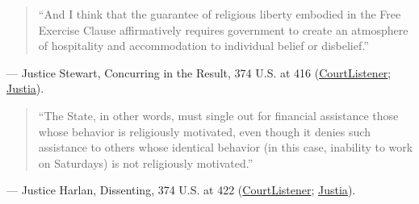 \documentclass[12pt]{article}
\begin{document}
\begin{quote}
``And I think that the guarantee of religious liberty embodied in the Free Exercise Clause affirmatively requires government to create an atmosphere of hospitality and accommodation to individual belief or disbelief.''
\end{quote}
\noindent --- Justice Stewart, Concurring in the Result, 374 U.S. at 416 (\href{https://www.courtlistener.com/opinion/106660/sherbert-v-verner/}{CourtListener}; \href{https://supreme.justia.com/cases/federal/us/374/398/}{Justia}).

\begin{quote}
``The State, in other words, must single out for financial assistance those whose behavior is religiously motivated, even though it denies such assistance to others whose identical behavior (in this case, inability to work on Saturdays) is not religiously motivated.''
\end{quote}
\noindent --- Justice Harlan, Dissenting, 374 U.S. at 422 (\href{https://www.courtlistener.com/opinion/106660/sherbert-v-verner/}{CourtListener}; \href{https://supreme.justia.com/cases/federal/us/374/398/}{Justia}).
\end{document}
